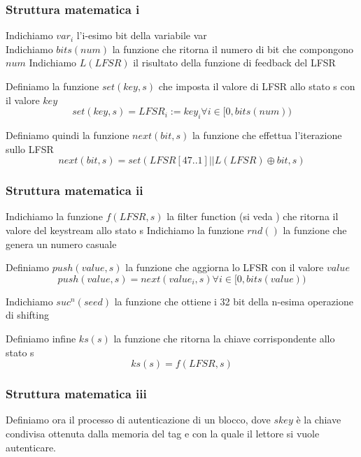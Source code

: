 \begin{frame}
    \frametitle{Struttura matematica i}
    Indichiamo \(var_i\) l'i-esimo bit della variabile var \\
    Indichiamo \(bits(num)\) la funzione che ritorna il numero di bit che compongono \(num\)
    Indichiamo \(L(LFSR)\) il risultato della funzione di feedback del LFSR~\cite{garcia2008dismantling}

    \pause
    Definiamo la funzione \(set(key, s)\) che imposta il valore di LFSR allo stato s con il valore \(key\)
    \[set(key, s) = LFSR_i := key_i \forall i \in [0, bits(num))\]

    \pause
    Definiamo quindi la funzione \(next(bit, s)\) la funzione che effettua l'iterazione sullo LFSR
    \[next(bit, s) = set(LFSR[47..1] || L(LFSR) \oplus bit, s)\]
\end{frame}

\begin{frame}
    \frametitle{Struttura matematica ii}
    Indichiamo la funzione \(f(LFSR, s)\) la filter function (si veda \cite{garcia2008dismantling}) che ritorna il valore del keystream allo stato s
    Indichiamo la funzione \(rnd()\) la funzione che genera un numero casuale

    \pause
    Definiamo \(push(value, s)\) la funzione che aggiorna lo LFSR con il valore \(value\)
    \[push(value, s) = next(value_i, s) \forall i \in [0, bits(value))\]

    \pause
    Indichiamo \(suc^n(seed)\) la funzione che ottiene i 32 bit della n-esima operazione di shifting~\cite{secRFIDMutualAuth}

    \pause
    Definiamo infine \(ks(s)\) la funzione che ritorna la chiave corrispondente allo stato s
    \[ks(s) = f(LFSR, s)\]
\end{frame}

\begin{frame}
    \frametitle{Struttura matematica iii}
    Definiamo ora il processo di autenticazione di un blocco, dove \(skey\) è la chiave condivisa ottenuta dalla memoria del tag e con la quale il lettore si vuole autenticare.
\end{frame}

